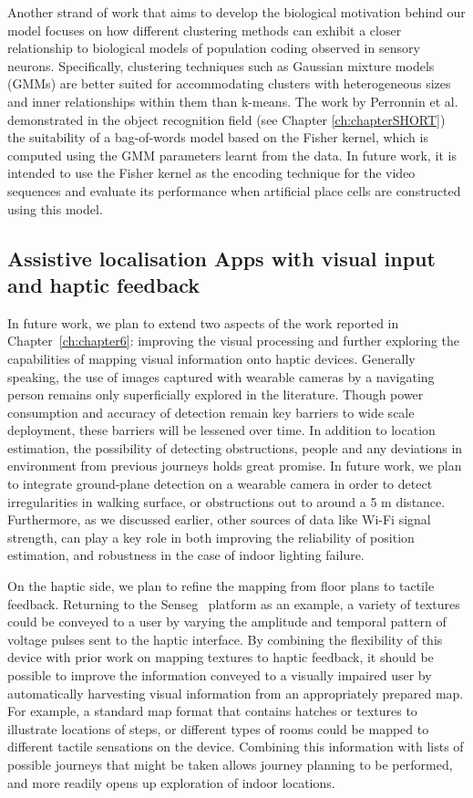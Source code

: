 Another strand of work that aims to develop the biological motivation behind our model focuses on how different clustering methods can exhibit a closer relationship to biological models of population coding observed in sensory neurons. Specifically, clustering techniques such as Gaussian mixture models (GMMs) are better suited for accommodating clusters with heterogeneous sizes and inner relationships within them than k-means. The work by Perronnin et al. \cite{ perronnin2007fisher, Perronnin2010, Jegou2012} demonstrated in the object recognition field (see Chapter \ref{ch:chapterSHORT}) the suitability of a bag-of-words model based on the Fisher kernel, which is computed using the GMM parameters learnt from the data. In future work, it is intended to use the Fisher kernel as the encoding technique for the video sequences and evaluate its performance when artificial place cells are constructed using this model.

\subsection{Assistive localisation Apps with visual input and haptic feedback}

In future work, we plan to extend two aspects of the work reported in Chapter~\ref{ch:chapter6}: improving the visual processing and further exploring the capabilities of mapping visual information onto haptic devices. Generally speaking, the use of images captured with wearable cameras by a navigating person remains only superficially explored in the literature. Though power consumption and accuracy of detection remain key barriers to wide scale deployment, these barriers will be lessened over time. In addition to location estimation, the possibility of detecting obstructions, people and any deviations in environment from previous journeys holds great promise. In future work, we plan to integrate ground-plane detection on a wearable camera in order to detect irregularities in walking surface, or obstructions out to around a 5 m distance. Furthermore, as we discussed earlier, other sources of data like Wi-Fi signal strength, can play a key role in both improving the reliability of position estimation, and robustness in the case of indoor lighting failure.

On the haptic side, we plan to refine the mapping from floor plans to tactile feedback. Returning to the Senseg\texttrademark~ platform as an example, a variety of textures could be conveyed to a user by varying the amplitude and temporal pattern of voltage pulses sent to the haptic interface. By combining the flexibility of this device with prior work on mapping textures to haptic feedback, it should be possible to improve the information conveyed to a visually impaired user by automatically harvesting visual information from an appropriately prepared map. For example, a standard map format that contains hatches or textures to illustrate locations of steps, or different types of rooms could be mapped to different tactile sensations on the device. Combining this information with lists of possible journeys that might be taken allows journey planning to be performed, and more readily opens up exploration of indoor locations.


